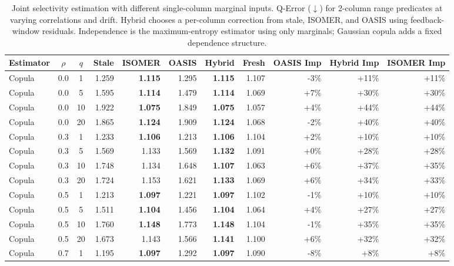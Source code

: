 \begin{table}[t]
  \centering
  \small
  \caption{Joint selectivity estimation with different single-column marginal inputs. Q-Error ($\downarrow$) for 2-column range predicates at varying correlations and drift. Hybrid chooses a per-column correction from stale, ISOMER, and OASIS using feedback-window residuals. Independence is the maximum-entropy estimator using only marginals; Gaussian copula adds a fixed dependence structure.}
  \label{tab:copula}
  \setlength{\tabcolsep}{3pt}
  \begin{tabular}{lcc | rrrrr | rrr}
    \toprule
    Estimator & $\rho$ & $q$ & Stale & ISOMER & OASIS & Hybrid & Fresh & OASIS Imp & Hybrid Imp & ISOMER Imp \\
    \midrule
    Copula & 0.0 & 1 & 1.259 & \textbf{1.115} & 1.295 & \textbf{1.115} & 1.107 & -3\% & +11\% & +11\% \\
    Copula & 0.0 & 5 & 1.595 & \textbf{1.114} & 1.479 & \textbf{1.114} & 1.069 & +7\% & +30\% & +30\% \\
    Copula & 0.0 & 10 & 1.922 & \textbf{1.075} & 1.849 & \textbf{1.075} & 1.057 & +4\% & +44\% & +44\% \\
    Copula & 0.0 & 20 & 1.865 & \textbf{1.124} & 1.909 & \textbf{1.124} & 1.068 & -2\% & +40\% & +40\% \\
    Copula & 0.3 & 1 & 1.233 & \textbf{1.106} & 1.213 & \textbf{1.106} & 1.104 & +2\% & +10\% & +10\% \\
    Copula & 0.3 & 5 & 1.569 & 1.133 & 1.569 & \textbf{1.132} & 1.091 & +0\% & +28\% & +28\% \\
    Copula & 0.3 & 10 & 1.748 & 1.134 & 1.648 & \textbf{1.107} & 1.063 & +6\% & +37\% & +35\% \\
    Copula & 0.3 & 20 & 1.724 & 1.153 & 1.621 & \textbf{1.133} & 1.069 & +6\% & +34\% & +33\% \\
    Copula & 0.5 & 1 & 1.213 & \textbf{1.097} & 1.221 & \textbf{1.097} & 1.102 & -1\% & +10\% & +10\% \\
    Copula & 0.5 & 5 & 1.511 & \textbf{1.104} & 1.456 & \textbf{1.104} & 1.064 & +4\% & +27\% & +27\% \\
    Copula & 0.5 & 10 & 1.760 & \textbf{1.148} & 1.773 & \textbf{1.148} & 1.104 & -1\% & +35\% & +35\% \\
    Copula & 0.5 & 20 & 1.673 & 1.143 & 1.566 & \textbf{1.141} & 1.100 & +6\% & +32\% & +32\% \\
    Copula & 0.7 & 1 & 1.195 & \textbf{1.097} & 1.292 & \textbf{1.097} & 1.090 & -8\% & +8\% & +8\% \\

\end{tabular}
\end{table}
